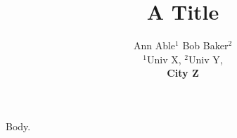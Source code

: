 \documentclass{article}
\begin{document}
\title{A Title}
\author{\begin{tabular}{c}Ann Able$^1$ Bob Baker$^2$\\ $^1$Univ X, $^2$Univ Y,\\ \bf City Z\end{tabular}}
\maketitle
Body.
\end{document}
